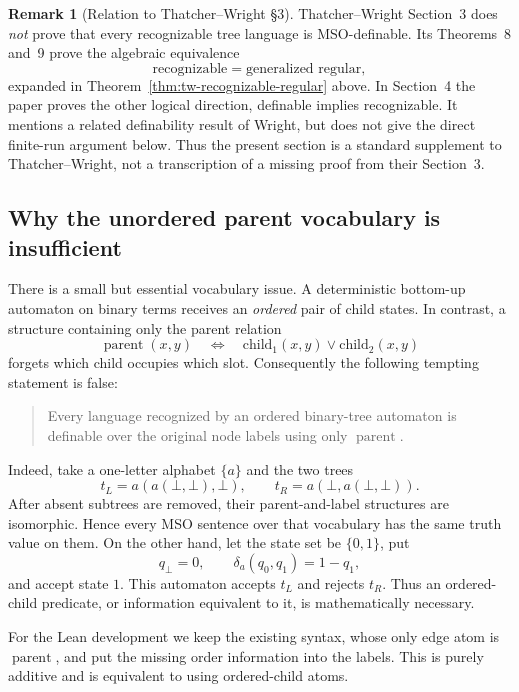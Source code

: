 \documentclass[11pt]{article}
\theoremstyle{definition}
\newtheorem{remark}[theorem]{Remark}
\newcommand{\TW}{Thatcher--Wright}
\newcommand{\child}{\mathrm{child}}
\begin{document}
\begin{remark}[Relation to \TW{} \S3]
\label{rem:tw3-scope}
\TW{} Section~3 does \emph{not} prove that every recognizable tree language is
MSO-definable.  Its Theorems~8 and~9 prove the algebraic equivalence
\[
  \text{recognizable}=\text{generalized regular},
\]
expanded in Theorem~\ref{thm:tw-recognizable-regular} above.  In Section~4 the
paper proves the other logical direction, definable implies recognizable.  It
mentions a related definability result of Wright, but does not give the direct
finite-run argument below.  Thus the present section is a standard supplement
to \TW{}, not a transcription of a missing proof from their Section~3.
\end{remark}

\subsection{Why the unordered parent vocabulary is insufficient}

There is a small but essential vocabulary issue.  A deterministic bottom-up
automaton on binary terms receives an \emph{ordered} pair of child states.  In
contrast, a structure containing only the parent relation
\[
  \operatorname{parent}(x,y)
  \quad\Longleftrightarrow\quad
  \child_1(x,y)\vee\child_2(x,y)
\]
forgets which child occupies which slot.  Consequently the following tempting
statement is false:

\begin{quote}
Every language recognized by an ordered binary-tree automaton is definable
over the original node labels using only \(\operatorname{parent}\).
\end{quote}

Indeed, take a one-letter alphabet \(\{a\}\) and the two trees
\[
  t_L=a(a(\bot,\bot),\bot),
  \qquad
  t_R=a(\bot,a(\bot,\bot)).
\]
After absent subtrees are removed, their parent-and-label structures are
isomorphic.  Hence every MSO sentence over that vocabulary has the same truth
value on them.  On the other hand, let the state set be \(\{0,1\}\), put
\[
  q_\bot=0,
  \qquad
  \delta_a(q_0,q_1)=1-q_1,
\]
and accept state \(1\).  This automaton accepts \(t_L\) and rejects \(t_R\).
Thus an ordered-child predicate, or information equivalent to it, is
mathematically necessary.

For the Lean development we keep the existing syntax, whose only edge atom is
\(\operatorname{parent}\), and put the missing order information into the
labels.  This is purely additive and is equivalent to using ordered-child
atoms.
\end{document}

